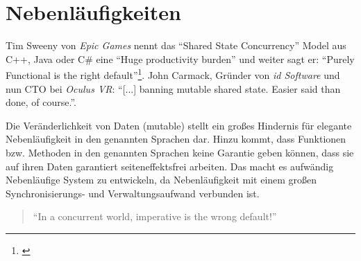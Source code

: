 \section{Nebenläufigkeiten}
\label{sec:nebenlaeufigkeiten}

Tim Sweeny von \textit{Epic Games} nennt das "`Shared State Concurrency"' Model aus C++, Java oder C\# eine "`Huge productivity burden"' und weiter sagt er: "`Purely Functional is the right default"'\footnote{\cite[Vgl.][Seite 42 u. Seite 56]{Sweeney2006}\label{note:sweeney-mainstream}}. John Carmack, Gründer von \textit{id Software} und nun CTO bei \textit{Oculus VR}: "`[...] banning mutable shared state. Easier said than done, of course."'.

Die Veränderlichkeit von Daten (mutable) stellt ein großes Hindernis für elegante Nebenläufigkeit in den genannten Sprachen dar. Hinzu kommt, dass Funktionen bzw. Methoden in den genannten Sprachen keine Garantie geben können, dass sie auf ihren Daten garantiert seiteneffektsfrei arbeiten. Das macht es aufwändig Nebenläufige System zu entwickeln, da Nebenläufigkeit mit einem großen Synchronisierungs- und Verwaltungsaufwand verbunden ist.

\begin{quote}
"`In a concurrent world, imperative is the wrong default!"'
\end{quote}

